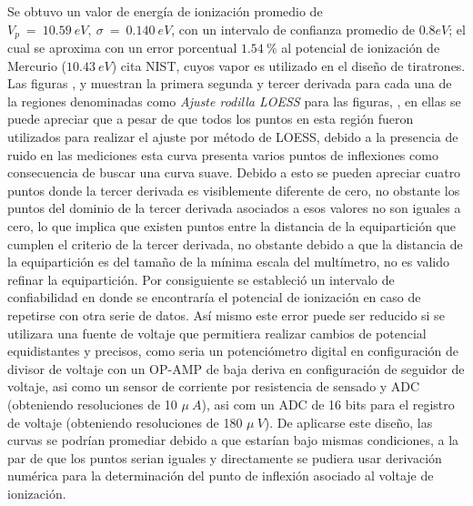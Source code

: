 Se obtuvo un valor de energía de ionización promedio de $V_{p}\ =\ 	10.59\ eV,\ \sigma\ =\ 0.140\ eV$, con un intervalo de confianza promedio de $0.8 eV$; el cual se aproxima con un error porcentual $1.54\ \%$ al potencial de ionización de Mercurio ($10.43\ eV$) {\color{Mulberry} cita NIST}, cuyos vapor es utilizado en el diseño de tiratrones. Las figuras \ut{\ref{fig:derspot1} - \ref{fig:derspot10}}, y \ut{\ref{fig:der3pot1} - \ref{fig:der3pot10}}  muestran la primera segunda y tercer derivada para cada una de la regiones denominadas como \textit{Ajuste rodilla LOESS} para las figuras, \ut{\ref{fig:pot1} - \ref{fig:pot10}}, en ellas se puede apreciar que a pesar de que todos los puntos en esta región fueron utilizados para realizar el ajuste por método de LOESS, debido a la presencia de ruido en las mediciones esta curva presenta varios puntos de inflexiones como consecuencia de buscar una curva suave. Debido a esto se pueden apreciar cuatro puntos donde la tercer derivada es visiblemente diferente de cero, no obstante los puntos del dominio de la tercer derivada asociados a esos valores no son iguales a cero, lo que implica que existen puntos entre la distancia de la equipartición que cumplen el criterio de la tercer derivada, no obstante debido a que la distancia de la equipartición es del tamaño de la mínima escala del multímetro, no es valido refinar la equipartición. Por consiguiente se estableció un intervalo de confiabilidad en donde se encontraría el potencial de ionización en caso de repetirse con otra serie de datos. Así mismo este error puede ser reducido si se utilizara una fuente de voltaje que permitiera realizar cambios de potencial equidistantes y precisos, como seria un potenciómetro digital en configuración de divisor de voltaje con un OP-AMP de baja deriva  en configuración de seguidor de voltaje, asi como un sensor de corriente por resistencia de sensado y ADC (obteniendo resoluciones de 10 $\mu\ A$), asi com un ADC de 16 bits para el registro de voltaje (obteniendo resoluciones de 180 $\mu\ V$). De aplicarse este diseño, las curvas se podrían promediar debido a que estarían bajo mismas condiciones, a la par de que los puntos serian iguales y directamente se pudiera usar derivación numérica para la determinación del punto de inflexión asociado al voltaje de ionización.
